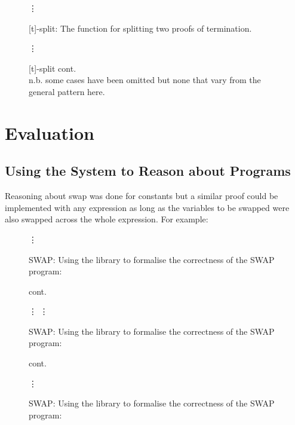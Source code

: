 \documentclass[oneside,12pt]{article}
\begin{document}
\begin{figure}
  \caption{[t]-split: The function for splitting two proofs of termination. }
  \footnotesize
  {\centering }
  {\centering \hfill \Huge{\vdots} \hfill }
\end{figure}

\begin{figure}\ContinuedFloat
  \caption{[t]-split cont. \\
   n.b. some cases have been omitted but none that vary from the general pattern here. }
  \footnotesize
  {\centering \hfill \Huge{\vdots} \hfill }
  {\centering }
\end{figure}


\section{Evaluation}

\subsection{Using the System to Reason about Programs}

Reasoning about swap was done for constants but a similar proof could be implemented with any expression as long as the variables to be swapped were also swapped across the whole expression. For example:


{\centering \footnotesize }


\begin{figure}
  \caption{SWAP: Using the library to formalise the correctness of the SWAP program:}
  \small
  {\centering }
  {\centering \hfill \Huge{\vdots} \hfill }
\end{figure}

\begin{figure}\ContinuedFloat
  \caption{SWAP: Using the library to formalise the correctness of the SWAP program:}
  \small
  \vspace{-0.5cm}
  \begin{center}\!\!\!\small{cont.}\end{center}
  {\centering \hfill \Huge{\vdots} \hfill }
  {\centering }
  {\centering \hfill \Huge{\vdots} \hfill }
\end{figure}

\begin{figure}\ContinuedFloat
  \caption{SWAP: Using the library to formalise the correctness of the SWAP program:}
  \small
  \vspace{-0.5cm}
  \begin{center}\!\!\!\small{cont.}\end{center}
  {\centering \hfill \Huge{\vdots} \hfill }
  {\centering }
\end{figure}
\end{document}
